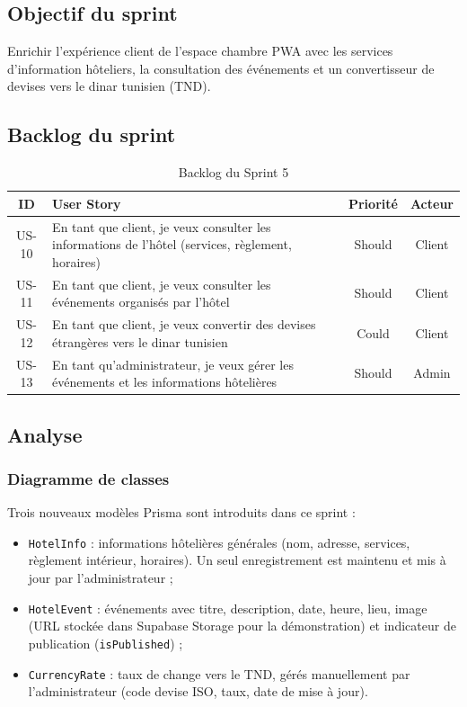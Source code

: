 \subsection{Objectif du sprint}

Enrichir l'expérience client de l'espace chambre PWA avec les services d'information hôteliers, la consultation des événements et un convertisseur de devises vers le dinar tunisien (TND).

\subsection{Backlog du sprint}

\begin{table}[H]
\centering
\caption{Backlog du Sprint 5}
\label{tab:backlog_sprint5}
\begin{tabular}{|c|p{9cm}|c|c|}
\hline
\textbf{ID} & \textbf{User Story} & \textbf{Priorité} & \textbf{Acteur} \\
\hline
US-10 & En tant que client, je veux consulter les informations de l'hôtel (services, règlement, horaires) & Should & Client \\
\hline
US-11 & En tant que client, je veux consulter les événements organisés par l'hôtel & Should & Client \\
\hline
US-12 & En tant que client, je veux convertir des devises étrangères vers le dinar tunisien & Could & Client \\
\hline
US-13 & En tant qu'administrateur, je veux gérer les événements et les informations hôtelières & Should & Admin \\
\hline
\end{tabular}
\end{table}

\subsection{Analyse}

\subsubsection{Diagramme de classes}


Trois nouveaux modèles Prisma sont introduits dans ce sprint :
\begin{itemize}
  \item \texttt{HotelInfo} : informations hôtelières générales (nom, adresse, services, règlement intérieur, horaires). Un seul enregistrement est maintenu et mis à jour par l'administrateur ;
  \item \texttt{HotelEvent} : événements avec titre, description, date, heure, lieu, image (URL stockée dans Supabase Storage pour la démonstration) et indicateur de publication (\texttt{isPublished}) ;
  \item \texttt{CurrencyRate} : taux de change vers le TND, gérés manuellement par l'administrateur (code devise ISO, taux, date de mise à jour).
\end{itemize}

